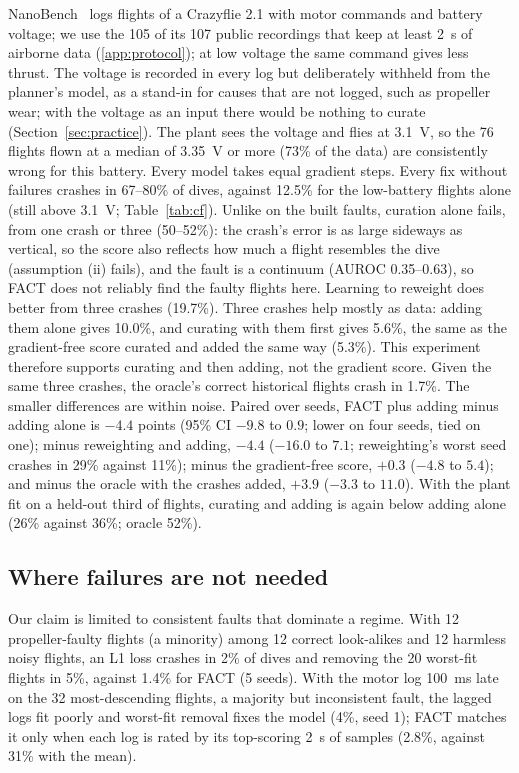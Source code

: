 \documentclass[preprint,12pt]{elsarticle}
\newcommand{\method}{FACT}
\begin{document}
NanoBench~\citep{ullah2026nanobench} logs flights of a Crazyflie 2.1 with motor commands and battery voltage; we use the 105 of its 107 public recordings that keep at least 2~s of airborne data (\ref{app:protocol}); at low voltage the same command gives less thrust. The voltage is recorded in every log but deliberately withheld from the planner's model, as a stand-in for causes that are not logged, such as propeller wear; with the voltage as an input there would be nothing to curate (Section~\ref{sec:practice}). The plant sees the voltage and flies at 3.1~V, so the 76 flights flown at a median of 3.35~V or more (73\% of the data) are consistently wrong for this battery. Every model takes equal gradient steps. Every fix without failures crashes in 67--80\% of dives, against 12.5\% for the low-battery flights alone (still above 3.1~V; Table~\ref{tab:cf}). Unlike on the built faults, curation alone fails, from one crash or three (50--52\%): the crash's error is as large sideways as vertical, so the score also reflects how much a flight resembles the dive (assumption (ii) fails), and the fault is a continuum (AUROC 0.35--0.63), so \method{} does not reliably find the faulty flights here. Learning to reweight does better from three crashes (19.7\%). Three crashes help mostly as data: adding them alone gives 10.0\%, and curating with them first gives 5.6\%, the same as the gradient-free score curated and added the same way (5.3\%). This experiment therefore supports curating and then adding, not the gradient score. Given the same three crashes, the oracle's correct historical flights crash in 1.7\%. The smaller differences are within noise. Paired over seeds, \method{} plus adding minus adding alone is $-4.4$ points (95\% CI $-9.8$ to $0.9$; lower on four seeds, tied on one); minus reweighting and adding, $-4.4$ ($-16.0$ to $7.1$; reweighting's worst seed crashes in 29\% against 11\%); minus the gradient-free score, $+0.3$ ($-4.8$ to $5.4$); and minus the oracle with the crashes added, $+3.9$ ($-3.3$ to $11.0$). With the plant fit on a held-out third of flights, curating and adding is again below adding alone (26\% against 36\%; oracle 52\%).

\subsection{Where failures are not needed}\label{sec:minority}
Our claim is limited to consistent faults that dominate a regime. With 12 propeller-faulty flights (a minority) among 12 correct look-alikes and 12 harmless noisy flights, an L1 loss crashes in 2\% of dives and removing the 20 worst-fit flights in 5\%, against 1.4\% for \method{} (5 seeds). With the motor log 100~ms late on the 32 most-descending flights, a majority but inconsistent fault, the lagged logs fit poorly and worst-fit removal fixes the model (4\%, seed 1); \method{} matches it only when each log is rated by its top-scoring 2~s of samples (2.8\%, against 31\% with the mean).
\end{document}
